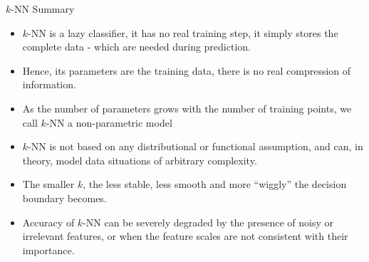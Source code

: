 \documentclass[11pt,compress,t,notes=noshow, xcolor=table]{beamer}
\begin{document}
\begin{vbframe}{$k$-NN Summary}

  \begin{itemize}
  \item $k$-NN is a lazy classifier, it has no real training step, it simply stores the complete data
    - which are needed during prediction.
  \item Hence, its parameters are the training data, there is no real compression of information.
  \item As the number of parameters grows with the number of training points, we call
    $k$-NN a non-parametric model
  \item $k$-NN is not based on any distributional or functional assumption,
    and can, in theory, model data situations of arbitrary complexity.
  \item The smaller $k$, the less stable, less smooth and more \enquote{wiggly} the decision
    boundary becomes.
  \item Accuracy of $k$-NN can be severely degraded by the presence of noisy or irrelevant features,
    or when the feature scales are not consistent with their importance.
  \end{itemize}

%
%
%
%
%
%

\end{vbframe}
\end{document}

